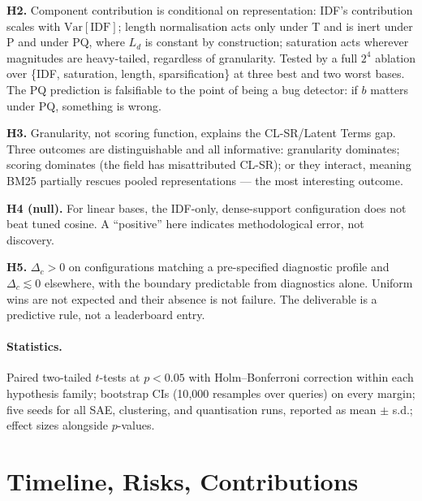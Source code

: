 \documentclass[11pt]{article}
\newcommand{\idf}{\mathrm{IDF}}
\begin{document}
\textbf{H2.} Component contribution is conditional on representation: IDF's contribution scales with $\mathrm{Var}[\idf]$; length normalisation acts only under T and is inert under P and under PQ, where $L_d$ is constant by construction; saturation acts wherever magnitudes are heavy-tailed, regardless of granularity. Tested by a full $2^4$ ablation over \{IDF, saturation, length, sparsification\} at three best and two worst bases. The PQ prediction is falsifiable to the point of being a bug detector: if $b$ matters under PQ, something is wrong.

\textbf{H3.} Granularity, not scoring function, explains the CL-SR/Latent Terms gap. Three outcomes are distinguishable and all informative: granularity dominates; scoring dominates (the field has misattributed CL-SR); or they interact, meaning BM25 partially rescues pooled representations --- the most interesting outcome.

\textbf{H4 (null).} For linear bases, the IDF-only, dense-support configuration does not beat tuned cosine. A ``positive'' here indicates methodological error, not discovery.

\textbf{H5.} $\Delta_c>0$ on configurations matching a pre-specified diagnostic profile and $\Delta_c\lesssim0$ elsewhere, with the boundary predictable from diagnostics alone. Uniform wins are not expected and their absence is not failure. The deliverable is a predictive rule, not a leaderboard entry.

\paragraph{Statistics.} Paired two-tailed $t$-tests at $p<0.05$ with Holm--Bonferroni correction within each hypothesis family; bootstrap CIs (10{,}000 resamples over queries) on every margin; five seeds for all SAE, clustering, and quantisation runs, reported as mean $\pm$ s.d.; effect sizes alongside $p$-values.

\section{Timeline, Risks, Contributions}
\end{document}
